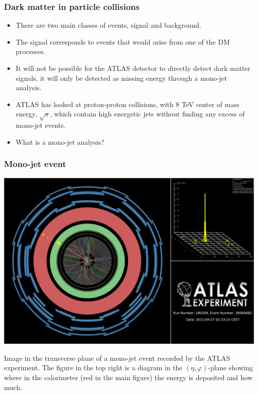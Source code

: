 \documentclass[handout]{beamer}
\begin{document}
\begin{frame}[shrink=10]\frametitle{Dark matter in particle collisions}
\begin{block}{}
\begin{itemize}
\item There are two main classes of events, signal and background. 
\item The signal corresponds to events that would arise from one of the DM processes.
\item It will not be possible for the ATLAS detector to directly detect dark matter signals, it will only be detected as missing energy through a mono-jet analysis.
\item ATLAS has looked at proton-proton collisions, with 8 TeV center of mass energy, $\sqrt{s}$, which contain high energetic jets without finding any excess of mono-jet events.
\item What is a mono-jet analysis?
\end{itemize}
\end{block}
\end{frame}


\begin{frame}[shrink=25]\frametitle{Mono-jet event}
\includegraphics[scale=0.07]{monojetbig.png}
\begin{block}{}
Image in the transverse plane of a mono-jet event recorded by the ATLAS experiment. The figure in the top right is a diagram in the $(\eta,\varphi)$-plane showing where in the calorimeter (red in the main figure) the energy is deposited and how much.
\end{block}
\end{frame}
\end{document}
